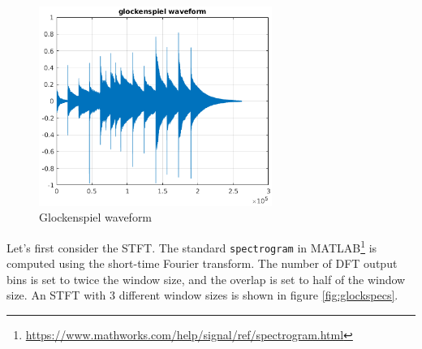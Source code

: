 \documentclass[letter,12pt]{article}
\begin{document}
\begin{figure}[ht]
	\centering
	\includegraphics[height=6.5cm]{./gspi_waveform.png}
	\caption{Glockenspiel waveform}
	\label{fig:glockwaveform}
\end{figure}

Let's first consider the STFT. The standard \Verb#spectrogram# in MATLAB\footnote{\url{https://www.mathworks.com/help/signal/ref/spectrogram.html}} is computed using the short-time Fourier transform. The number of DFT output bins is set to twice the window size, and the overlap is set to half of the window size. An STFT with 3 different window sizes is shown in figure \ref{fig:glockspecs}.
\end{document}
